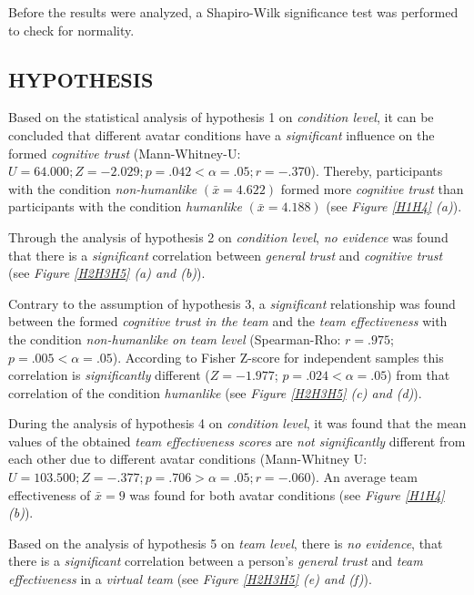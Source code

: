\documentclass[sigchi]{acmart}
\begin{document}
Before the results were analyzed, a Shapiro-Wilk significance test was performed to check for normality.

\subsection{HYPOTHESIS}
Based on the statistical analysis of hypothesis 1 on \textit{condition level}, it can be concluded that different avatar conditions have a \textit{significant} influence on the formed \textit{cognitive trust} (Mann-Whitney-U: $U = 64.000; Z = -2.029; p =.042 < \alpha =.05; r =-.370$). Thereby, participants with the condition \textit{non-humanlike} $(\bar{x} = 4.622)$ formed more \textit{cognitive trust} than participants with the condition \textit{humanlike} $(\bar{x} = 4.188)$ (see \textit{Figure \ref{H1H4} (a)}). 

Through the analysis of hypothesis 2 on \textit{condition level}, \textit{no evidence} was found that there is a \textit{significant} correlation between \textit{general trust} and \textit{cognitive trust} (see \textit{Figure \ref{H2H3H5} (a) and (b)}). 

Contrary to the assumption of hypothesis 3, a \textit{significant} relationship was found between the formed \textit{cognitive trust in the team} and the \textit{team effectiveness} with the condition \textit{non-humanlike} \textit{on team level} (Spearman-Rho: $r =.975$; $p =.005 < \alpha = .05$). According to Fisher Z-score for independent samples \citep[p. 110]{cohen2013statistical} this correlation is \textit{significantly} different ($Z=-1.977$; $p =.024 < \alpha = .05$) from that correlation of the condition \textit{humanlike} (see \textit{Figure \ref{H2H3H5} (c) and (d)}).
 
During the analysis of hypothesis 4 on \textit{condition level}, it was found that the mean values of the obtained \textit{team effectiveness scores} are \textit{not significantly} different from each other due to different avatar conditions (Mann-Whitney U: $U = 103.500; Z = -.377; p =.706 > \alpha = .05; r = -.060$). An average team effectiveness of $\bar{x} = 9$ was found for both avatar conditions (see \textit{Figure \ref{H1H4} (b)}).

Based on the analysis of hypothesis 5 on \textit{team level}, there is \textit{no evidence}, that there is a \textit{significant} correlation between a person's \textit{general trust} and \textit{team effectiveness} in a \textit{virtual team} (see \textit{Figure \ref{H2H3H5} (e) and (f)}).
\end{document}
